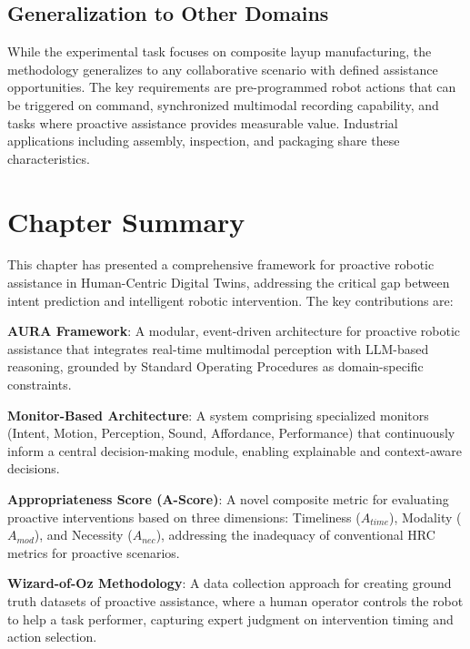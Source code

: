 \subsection{Generalization to Other Domains}

While the experimental task focuses on composite layup manufacturing, the methodology generalizes to any collaborative scenario with defined assistance opportunities. The key requirements are pre-programmed robot actions that can be triggered on command, synchronized multimodal recording capability, and tasks where proactive assistance provides measurable value. Industrial applications including assembly, inspection, and packaging share these characteristics.

\section{Chapter Summary}
\label{sec:proactive_summary}

This chapter has presented a comprehensive framework for proactive robotic assistance in Human-Centric Digital Twins, addressing the critical gap between intent prediction and intelligent robotic intervention. The key contributions are:

\textbf{AURA Framework}: A modular, event-driven architecture for proactive robotic assistance that integrates real-time multimodal perception with LLM-based reasoning, grounded by Standard Operating Procedures as domain-specific constraints.

\textbf{Monitor-Based Architecture}: A system comprising specialized monitors (Intent, Motion, Perception, Sound, Affordance, Performance) that continuously inform a central decision-making module, enabling explainable and context-aware decisions.

\textbf{Appropriateness Score (A-Score)}: A novel composite metric for evaluating proactive interventions based on three dimensions: Timeliness ($A_{time}$), Modality ($A_{mod}$), and Necessity ($A_{nec}$), addressing the inadequacy of conventional HRC metrics for proactive scenarios.

\textbf{Wizard-of-Oz Methodology}: A data collection approach for creating ground truth datasets of proactive assistance, where a human operator controls the robot to help a task performer, capturing expert judgment on intervention timing and action selection.

